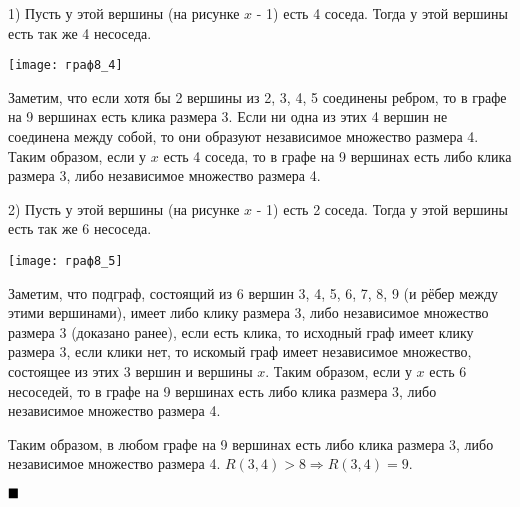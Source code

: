 \documentclass[a4paper, 16pt]{article}
\newenvironment{proof}[1][Доказательство]{%
	\begin{trivlist}
		\item[\hskip \labelsep {\bfseries #1:}]
		\item \hspace{14pt}
	}{
		$ \hfill\blacksquare $
	\end{trivlist}
	\hfill\break
}
\begin{document}
\begin{proof}
		1) Пусть у этой вершины (на рисунке $x$ - 1) есть 4 соседа. Тогда у этой вершины есть так же 4 несоседа.
		
			\texttt{[image: граф8\_4]}
			
			Заметим, что если хотя бы 2 вершины из 2, 3, 4, 5 соединены ребром, то в графе на 9 вершинах есть клика размера 3. Если ни одна из этих 4 вершин не соединена между собой, то они образуют независимое множество размера 4. Таким образом, если у $x$ есть 4 соседа, то в графе на 9 вершинах есть либо клика размера 3, либо независимое множество размера 4.
			
		2) Пусть у этой вершины (на рисунке $x$ - 1) есть 2 соседа. Тогда у этой вершины есть так же 6 несоседа.
		
			\texttt{[image: граф8\_5]}
			
			Заметим, что подграф, состоящий из 6 вершин 3, 4, 5, 6, 7, 8, 9 (и рёбер между этими вершинами), имеет либо клику размера 3, либо независимое множество размера 3 (доказано ранее), если есть клика, то исходный граф имеет клику размера 3, если клики нет, то искомый граф имеет независимое множество, состоящее из этих 3 вершин и вершины $x$. Таким образом, если у $x$ есть 6 несоседей, то в графе на 9 вершинах есть либо клика размера 3, либо независимое множество размера 4.
			
		Таким образом, в любом графе на
		9
		вершинах
		есть либо клика размера 3, либо независимое множество размера 4. $R(3, 4) > 8 \Rightarrow R(3, 4) = 9$.
	
		
	\end{proof}
	
	
	
	
	
	
	
	
	
	
	
	
	
	
	
\end{document}
